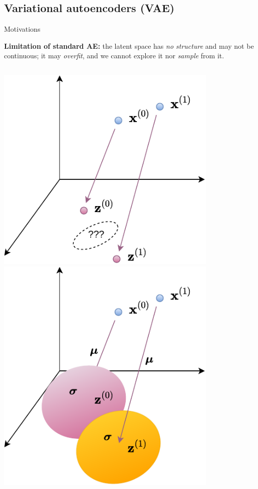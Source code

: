 \documentclass[handout]{beamer}
\begin{document}
  \subsection{Variational autoencoders (VAE)}

  \begin{frame}{Motivations}
    
    \textbf{Limitation of standard AE:} the latent space has \emph{no structure} and may not be continuous; it may \emph{overfit}, and we cannot explore it nor \emph{sample} from it.
    \pause
    \begin{columns}[T,onlytextwidth]
      \centering
      \includegraphics[width=0.8\textwidth]{rc/ae-latent}
      \pause
      \centering
      \includegraphics[width=0.8\textwidth]{rc/vae-latent}
    \end{columns}

  \end{frame}
\end{document}

